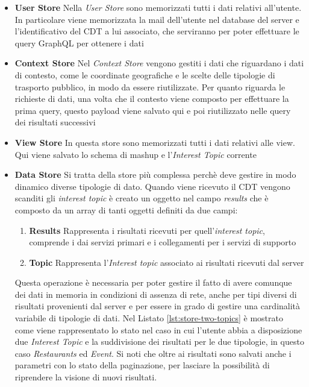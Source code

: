 \begin{itemize}
	\item  \textbf{User Store}
	Nella \emph{User Store} sono memorizzati tutti i dati relativi all'utente. In particolare viene memorizzata la mail dell'utente nel database del server e l'identificativo del CDT a lui associato, che serviranno per poter effettuare le query GraphQL per ottenere i dati
	\item \textbf{Context Store}
	Nel \emph{Context Store} vengono gestiti i dati che riguardano i dati di contesto, come le coordinate geografiche e le scelte delle tipologie di trasporto pubblico, in modo da essere riutilizzate. Per quanto riguarda le richieste di dati, una volta che il contesto viene composto per effettuare la prima query, questo payload viene salvato qui e poi riutilizzato nelle query dei risultati successivi
	\item \textbf{View Store}
	In questa store sono memorizzati tutti i dati relativi alle view. Qui viene salvato lo schema di mashup e l'\emph{Interest Topic} corrente
	\item \textbf{Data Store}
	Si tratta della store più complessa perchè deve gestire in modo dinamico diverse tipologie di dato. Quando viene ricevuto il CDT vengono scanditi gli \emph{interest topic} è creato un oggetto nel campo \emph{results} che è composto da un array di tanti oggetti definiti da due campi:
	\begin{enumerate}
		\item \textbf{Results}
		Rappresenta i risultati ricevuti per quell'\emph{interest topic}, comprende i dai servizi primari e i collegamenti per i servizi di supporto
		\item \textbf{Topic}
		Rappresenta l'\emph{Interest topic} associato ai risultati ricevuti dal server
	\end{enumerate}
	Questa operazione è necessaria per poter gestire il fatto di avere comunque dei dati in memoria in condizioni di assenza di rete, anche per tipi diversi di risultati provenienti dal server e per essere in grado di gestire una cardinalità variabile di tipologie di dati. Nel Listato \ref{lst:store-two-topics} è mostrato come viene rappresentato lo stato nel caso in cui l'utente abbia a disposizione due \emph{Interest Topic} e la suddivisione dei risultati per le due tipologie, in questo caso \emph{Restaurants} ed \emph{Event}. Si noti che oltre ai risultati sono salvati anche i parametri con lo stato della paginazione, per lasciare la possibilità di riprendere la visione di nuovi risultati.
\end{itemize}

